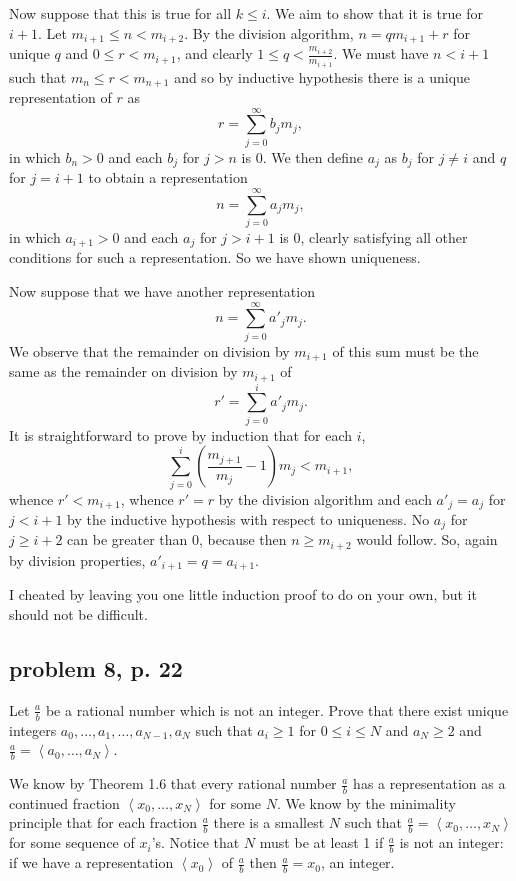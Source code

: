 \documentclass[12pt]{article}
\begin{document}
Now suppose that this is true for all $k\leq i$.  We aim to show that it is true for $i+1$.  Let $m_{i+1} \leq n < m_{i+2}$.  By the division algorithm, $n = qm_{i+1} + r$ for unique $q$ and $0\leq r < m_{i+1}$, and clearly $1 \leq q <\frac{m_{i+2}}{m_{i+1}}$.  We must have $n<i+1$ such that $m_n \leq r<m_{n+1}$ and so by inductive hypothesis there is a unique representation of $r$ as  $$r = \sum_{j=0}^\infty b_jm_j,$$ in which $b_n>0$ and each $b_j$ for $j>n$ is 0.  We then define $a_j$ as $b_j$ for $j \neq i$ and $q$ for $j=i+1$ to obtain a representation
 $$n = \sum_{j=0}^\infty a_jm_j,$$ in which $a_{i+1}>0$ and each $a_j$ for $j>i+1$ is 0, clearly satisfying all other conditions for such a representation.  So we have shown uniqueness.

Now suppose that we have another representation $$n = \sum_{j=0}^\infty a'_jm_j.$$  We observe that the remainder on division by $m_{i+1}$ of this sum must be the same as the remainder on division by $m_{i+1}$ of $$r' = \sum_{j=0}^i a'_jm_j.$$  It is straightforward to prove by induction that for each $i$, $$\sum_{j=0}^i(\frac{m_{j+1}}{m_j}-1)m_j<m_{i+1},$$ whence $r'  < m_{i+1}$,
whence $r'=r$  by the division algorithm  and each $a'_j=a_j$ for $j<i+1$ by the inductive hypothesis with respect to uniqueness.  No $a_j$ for $j\geq i+2$ can be greater than 0, because then $n \geq m_{i+2}$ would follow.  So, again by division properties, $a'_{i+1} = q = a_{i+1}$.

I cheated by leaving you one little induction proof to do on your own, but it should not be difficult.

\subsection{problem 8, p. 22}

Let $\frac ab$ be a rational number which is not an integer.  Prove that there exist unique integers $a_0,\ldots,a_1,\ldots,a_{N-1},a_N$ such that $a_i \geq 1$ for $0 \leq i\leq N$
and $a_N \geq 2$ and $\frac ab = \left<a_0,\ldots,a_N\right>$.

We know by Theorem 1.6 that every rational number $\frac ab$ has a representation as a continued fraction $\left<x_0,\ldots,x_N\right>$ for some $N$.  We know
by the minimality principle that for each fraction $\frac ab$ there is a smallest $N$ such that  $\frac ab = \left<x_0,\ldots,x_N\right>$ for some sequence of $x_i$'s.  Notice
that $N$ must be at least 1 if $\frac ab$ is not an integer:  if we have a representation $\left<x_0\right>$ of $\frac ab$ then $\frac ab = x_0$, an integer.
\end{document}
